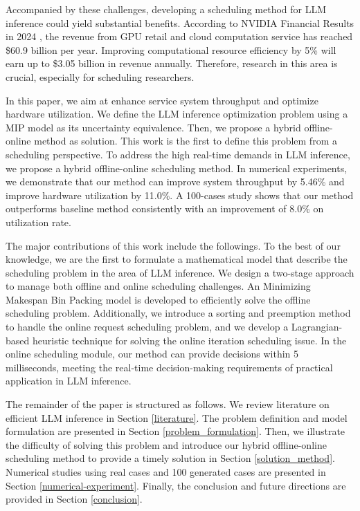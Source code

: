 Accompanied by these challenges, developing a scheduling method for LLM inference could yield substantial benefits. According to NVIDIA Financial Results in 2024 \cite{nvidia2024finance}, the revenue from GPU retail and cloud computation service has reached \$60.9 billion per year. Improving computational resource efficiency by 5\% will earn up to \$3.05 billion in revenue annually. Therefore, research in this area is crucial, especially for scheduling researchers.

In this paper, we aim at enhance service system throughput and optimize hardware utilization. We define the LLM inference optimization problem using a MIP model as its uncertainty equivalence. Then, we propose a hybrid offline-online method as solution. This work is the first to define this problem from a scheduling perspective. To address the high real-time demands in LLM inference, we propose a hybrid offline-online scheduling method. In numerical experiments, we demonstrate that our method can improve system throughput by 5.46\% and improve hardware utilization by 11.0\%. A 100-cases study shows that our method outperforms baseline method consistently with an improvement of 8.0\% on utilization rate.

The major contributions of this work include the followings. To the best of our knowledge, we are the first to formulate a mathematical model that describe the scheduling problem in the area of LLM inference. We design a two-stage approach to manage both offline and online scheduling challenges. An Minimizing Makespan Bin Packing model is developed to efficiently solve the offline scheduling problem. Additionally, we introduce a sorting and preemption method to handle the online request scheduling problem, and we develop a Lagrangian-based heuristic technique for solving the online iteration scheduling issue. In the online scheduling module, our method can provide decisions within 5 milliseconds, meeting the real-time decision-making requirements of practical application in LLM inference.



The remainder of the paper is structured as follows. We review literature on efficient LLM inference in Section \ref{literature}. The problem definition and model formulation are presented in Section \ref{problem_formulation}. Then, we illustrate the difficulty of solving this problem and introduce our hybrid offline-online scheduling method to provide a timely solution in Section \ref{solution_method}. Numerical studies using real cases and 100 generated cases are presented in Section \ref{numerical-experiment}. Finally, the conclusion and future directions are provided in Section \ref{conclusion}.